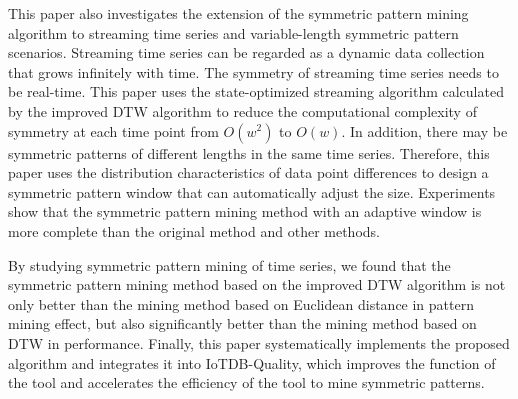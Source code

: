 \begin{abstract*}
  This paper also investigates the extension of the symmetric 
  pattern mining algorithm to streaming time series and 
  variable-length symmetric pattern scenarios. Streaming time 
  series can be regarded as a dynamic data collection that 
  grows infinitely with time. The symmetry of streaming time 
  series needs to be real-time. This paper uses the 
  state-optimized streaming algorithm calculated by 
  the improved DTW algorithm to reduce the computational 
  complexity of symmetry at each time point from 
  $O\left( w^2 \right)$ to $O\left( w \right)$. 
  In addition, there may be symmetric patterns of different 
  lengths in the same time series. Therefore, this paper uses 
  the distribution characteristics of data point differences 
  to design a symmetric pattern window that can automatically 
  adjust the size. Experiments show that the symmetric pattern 
  mining method with an adaptive window is more complete than 
  the original method and other methods.

  By studying symmetric pattern mining of time series, 
  we found that the symmetric pattern mining method based on 
  the improved DTW algorithm is not only better than the mining 
  method based on Euclidean distance in pattern mining effect, 
  but also significantly better than the mining method based 
  on DTW in performance. Finally, this paper systematically 
  implements the proposed algorithm and integrates it into 
  IoTDB-Quality, which improves the function of the tool and 
  accelerates the efficiency of the tool to mine symmetric 
  patterns.
\end{abstract*}
